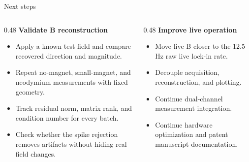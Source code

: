 \documentclass[aspectratio=169,10pt]{beamer}
\newcommand{\smallitemsep}{\setlength{\itemsep}{0.45em}}
\begin{document}
\begin{frame}{Next steps}
\begin{columns}[T,totalwidth=\textwidth]
\begin{column}{0.48\textwidth}
\textbf{Validate B reconstruction}
\begin{itemize}\smallitemsep
  \item Apply a known test field and compare recovered direction and magnitude.
  \item Repeat no-magnet, small-magnet, and neodymium measurements with fixed geometry.
  \item Track residual norm, matrix rank, and condition number for every batch.
  \item Check whether the spike rejection removes artifacts without hiding real field changes.
\end{itemize}
\end{column}
\begin{column}{0.48\textwidth}
\textbf{Improve live operation}
\begin{itemize}\smallitemsep
  \item Move live B closer to the 12.5 Hz raw live lock-in rate.
  \item Decouple acquisition, reconstruction, and plotting.
  \item Continue dual-channel measurement integration.
  \item Continue hardware optimization and patent manuscript documentation.
\end{itemize}
\end{column}
\end{columns}
\end{frame}
\end{document}
